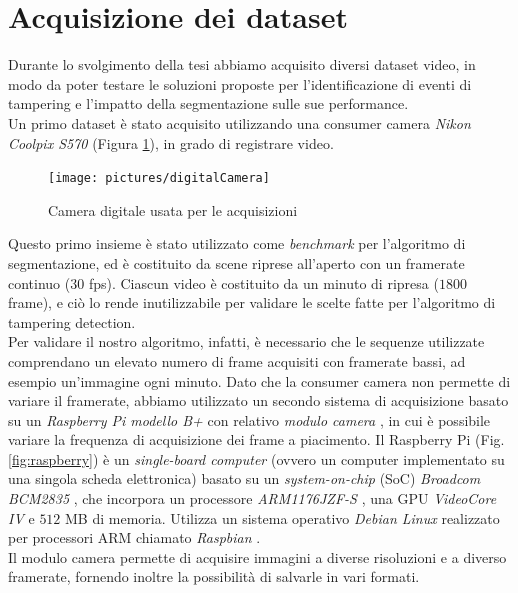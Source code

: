 \section{Acquisizione dei dataset}
\label{acquisizione}
Durante lo svolgimento della tesi abbiamo acquisito diversi dataset video, in modo da poter testare le soluzioni proposte per l'identificazione di eventi di tampering e l'impatto della segmentazione sulle sue performance.\\
Un primo dataset \`e stato acquisito utilizzando una consumer camera \textit{Nikon Coolpix S570} \cite{nikon} (Figura \ref{fig:digitalCamera}), in grado di registrare video.
\begin{figure}
\centering
\texttt{[image: pictures/digitalCamera]}
\caption[Camera digitale usata per le acquisizioni]{Camera digitale usata per le acquisizioni}
\label{fig:digitalCamera}
\end{figure}
Questo primo insieme \`e stato utilizzato come \textit{benchmark} per l'algoritmo di segmentazione, ed \`e costituito da scene riprese all'aperto con un framerate continuo ($30$ fps).
Ciascun video \`e costituito da un minuto di ripresa ($1800$ frame), e ci\`o lo rende inutilizzabile per validare le scelte fatte per l'algoritmo di tampering detection.\\
Per validare il nostro algoritmo, infatti, \`e necessario che le sequenze utilizzate comprendano un elevato numero di frame acquisiti con framerate bassi, ad esempio un'immagine ogni minuto. 
Dato che la consumer camera non permette di variare il framerate, abbiamo utilizzato un secondo sistema di acquisizione basato su un \textit{Raspberry Pi modello B+} \cite{raspberry} con relativo \textit{modulo camera} \cite{raspberryCamera}, in cui \`e possibile variare la frequenza di acquisizione dei frame a piacimento.
Il Raspberry Pi (Fig. \ref{fig:raspberry}) \`e un \textit{single-board computer} (ovvero un computer implementato su una singola scheda elettronica) basato su un \textit{system-on-chip} (SoC) \textit{Broadcom BCM2835} \cite{broadcom}, che incorpora un processore \textit{ARM1176JZF-S} \cite{arm}, una GPU \textit{VideoCore IV} \cite{gpu} e $512$ MB di memoria.
Utilizza un sistema operativo \textit{Debian Linux} realizzato per processori ARM chiamato \textit{Raspbian} \cite{raspbian}.\\
Il modulo camera permette di acquisire immagini a diverse risoluzioni e a diverso framerate, fornendo inoltre la possibilit\`a di salvarle in vari formati.\\
